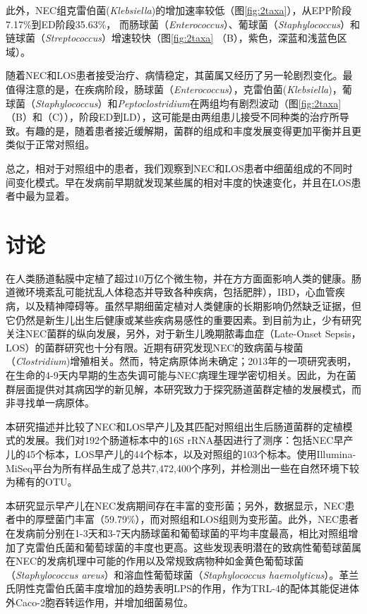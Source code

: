 {{      此外，NEC组克雷伯菌(\textit{Klebsiella})的增加速率较低（图\ref{fig:2taxa}），从EPP阶段7.17\%到ED阶段35.63\%， 而肠球菌（\textit{Enterococcus}）、葡球菌（\textit{Staphylococcus}）和链球菌（\textit{Streptococcus}）增速较快（图\ref{fig:2taxa} （B），紫色，深蓝和浅蓝色区域）。

      随着NEC和LOS患者接受治疗、病情稳定，其菌属又经历了另一轮剧烈变化。最值得注意的是，在疾病阶段，肠球菌（\textit{Enterococcus}），克雷伯菌(\textit{Klebsiella})，葡球菌（\textit{Staphylococcus}）和\textit{Peptoclostridium}在两组均有剧烈波动（图\ref{fig:2taxa}（B）和（C）），阶段ED到LD），这可能是由两组患儿接受不同种类的治疗所导致。有趣的是，随着患者接近缓解期，菌群的组成和丰度发展变得更加平衡并且更类似于正常对照组。

      总之，相对于对照组中的患者，我们观察到NEC和LOS患者中细菌组成的不同时间变化模式。早在发病前早期就发现某些属的相对丰度的快速变化，并且在LOS患者中最为显着。


\section{讨论}
在人类肠道黏膜中定植了超过10万亿个微生物\cite{Ley2006}，并在方方面面影响人类的健康\cite{Sekirov2009}。肠道微环境紊乱可能扰乱人体稳态并导致各种疾病，包括肥胖\cite{Liu2017}），IBD\cite{Ley2006}，心血管疾病\cite{Wang2011}，以及精神障碍\cite{Rogers2016}等。虽然早期细菌定植对人类健康的长期影响仍然缺乏证据，但它仍然是新生儿出生后健康或某些疾病易感性的重要因素。到目前为止，少有研究关注NEC菌群的纵向发展，另外，对于新生儿晚期脓毒血症（Late-Onset Sepsis，LOS）的菌群研究也十分有限。近期有研究发现NEC的致病菌与梭菌（\textit{Clostridium})增殖相关\cite{hosny2017updating}。然而，特定病原体尚未确定；2013年的一项研究表明，在生命的4-9天内早期的生态失调可能与NEC病理生理学密切相关\cite{morrow2013early}。因此，为在菌群层面提供对其病因学的新见解，本研究致力于探究肠道菌群定植的发展模式，而非寻找单一病原体。

本研究描述并比较了NEC和LOS早产儿及其匹配对照组出生后肠道菌群的定植模式的发展。我们对192个肠道标本中的16S rRNA基因进行了测序：包括NEC早产儿的45个标本，LOS早产儿的44个标本，以及对照组的103个标本。使用Illumina-MiSeq平台为所有样品生成了总共7,472,400个序列，并检测出一些在自然环境下较为稀有的OTU。

本研究显示早产儿在NEC发病期间存在丰富的变形菌；另外，数据显示，NEC患者中的厚壁菌门丰富（59.79\%），而对照组和LOS组则为变形菌。此外，NEC患者在发病前分别在1-3天和3-7天内肠球菌和葡萄球菌的平均丰度最高，相比对照组增加了克雷伯氏菌和葡萄球菌的丰度也更高。这些发现表明潜在的致​​病性葡萄球菌属在NEC的发病机理中可能的作用以及常规致病物种如金黄色葡萄球菌（\textit{Staphylococcus areus}）和溶血性葡萄球菌（\textit{Staphylococcus haemolyticus}）。革兰氏阴性克雷伯氏菌丰度增加的趋势表明LPS的作用，作为TRL-4的配体其能促进体外Caco-2胞吞转运作用\cite{panigrahi1996escherichia}，并增加细菌易位\cite{Deitch1987}。

}}
